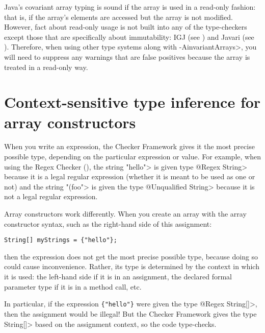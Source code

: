Java's covariant array typing is sound if the array is used in a read-only
fashion:  that is, if the array's elements are accessed but the array is
not modified.  However, fact about read-only usage is not built into any of
the type-checkers except those that are specifically about immutability:
IGJ (see ) and Javari (see
).  Therefore, when using other type systems
along with \<-AinvariantArrays>, you will need to suppress any warnings that
are false positives because the array is treated in a read-only way.




\section{Context-sensitive type inference for array constructors\label{array-context-sensitive}}

When you write an expression, the Checker Framework gives it the most
precise possible type, depending on the particular expression or value.
For example, when using the Regex Checker (),
the string \<"hello"> is given type \<@Regex String> because it is a legal
regular expression (whether it is meant to be used as one or not) and the
string \<"(foo"> is given the type \<@Unqualified String> because it is not
a legal regular expression.

Array constructors work differently.  When you create an array with the
array constructor syntax, such as the right-hand side of this assignment:

\begin{Verbatim}
String[] myStrings = {"hello"};
\end{Verbatim}

\noindent
then the expression does not get the most precise possible type, because
doing so could cause inconvenience.  Rather, its type is determined by the
context in which it is used:  the left-hand side if it is in an assignment,
the declared formal parameter type if it is in a method call, etc.

In particular, if the expression \verb|{"hello"}| were given the type
\<@Regex String[]>, then the assignment would be illegal!  But the Checker
Framework gives the type \<String[]> based on the assignment context, so the code
type-checks.

